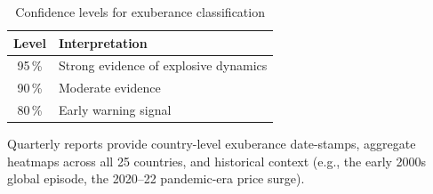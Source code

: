 \begin{table}[ht]
  \centering
  \caption{Confidence levels for exuberance classification}
  \label{tab:confidence}
  \begin{tabular}{cl}
    \toprule
    Level & Interpretation \\
    \midrule
    95\,\% & Strong evidence of explosive dynamics \\
    90\,\% & Moderate evidence \\
    80\,\% & Early warning signal \\
    \bottomrule
  \end{tabular}
\end{table}

Quarterly reports provide country-level exuberance date-stamps, aggregate
heatmaps across all 25 countries, and historical context (e.g., the early
2000s global episode, the 2020--22 pandemic-era price surge).

